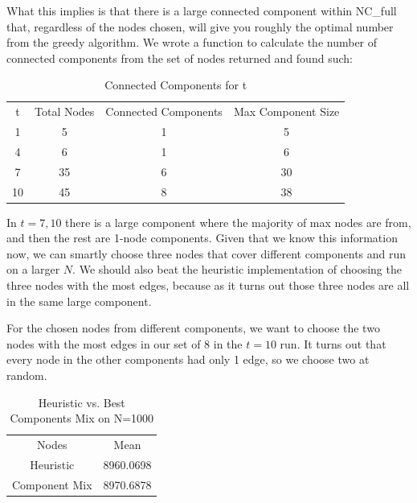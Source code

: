 \documentclass{article}
\begin{document}
		What this implies is that there is a large connected component within NC\_full that, regardless of the nodes chosen, will give you roughly the optimal number from the greedy algorithm. We wrote a function to calculate the number of connected components from the set of nodes returned and found such:

		\begin{table}[h!]
		  \begin{center}
		    \caption{Connected Components for t}
		    \label{tab:table3}
		    \begin{tabular}{|c|c|c|c|} 
		      \hline
		      t & Total Nodes & Connected Components & Max Component Size\\
		      1  & 5 & 1 & 5\\
		      4  & 6 & 1 & 6\\
		      7  & 35 & 6 & 30\\
		      10 & 45 & 8 & 38\\
		      \hline
		    \end{tabular}
		  \end{center}
		\end{table}

		In $t=7,10$ there is a large component where the majority of max nodes are from, and then the rest are 1-node components. Given that we know this information now, we can smartly choose three nodes that cover different components and run on a larger $N$. We should also beat the heuristic implementation of choosing the three nodes with the most edges, because as it turns out those three nodes are all in the same large component.

		For the chosen nodes from different components, we want to choose the two nodes with the most edges in our set of 8 in the $t=10$ run. It turns out that every node in the other components had only 1 edge, so we choose two at random.

		\begin{table}[h!]
		  \begin{center}
		    \caption{Heuristic vs. Best Components Mix on N=1000}
		    \label{tab:table4}
		    \begin{tabular}{|c|c|} 
		      \hline
		      Nodes & Mean\\
		      Heuristic & 8960.0698 \\
		      Component Mix & 8970.6878 \\
		      \hline
		    \end{tabular}
		  \end{center}
		\end{table}
\end{document}
